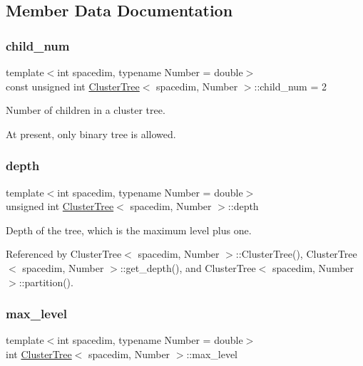 \subsection{Member Data Documentation}
\mbox{\label{classClusterTree_aa9705d3fecd5b405b804331ea031570c}} 
\subsubsection{\texorpdfstring{child\+\_\+num}{child\_num}}
{\footnotesize\ttfamily template$<$int spacedim, typename Number = double$>$ \\
const unsigned int \hyperlink{classClusterTree}{Cluster\+Tree}$<$ spacedim, Number $>$\+::child\+\_\+num = 2\hspace{0.3cm}{\ttfamily [static]}}

Number of children in a cluster tree.

At present, only binary tree is allowed. \mbox{\label{classClusterTree_a051df20340ed3f0e4bc0ee1fb1119f9f}} 
\subsubsection{\texorpdfstring{depth}{depth}}
{\footnotesize\ttfamily template$<$int spacedim, typename Number = double$>$ \\
unsigned int \hyperlink{classClusterTree}{Cluster\+Tree}$<$ spacedim, Number $>$\+::depth\hspace{0.3cm}{\ttfamily [private]}}

Depth of the tree, which is the maximum level plus one. 

Referenced by Cluster\+Tree$<$ spacedim, Number $>$\+::\+Cluster\+Tree(), Cluster\+Tree$<$ spacedim, Number $>$\+::get\+\_\+depth(), and Cluster\+Tree$<$ spacedim, Number $>$\+::partition().

\mbox{\label{classClusterTree_a77800bb9f86c689821ba4d549ce97a58}} 
\subsubsection{\texorpdfstring{max\+\_\+level}{max\_level}}
{\footnotesize\ttfamily template$<$int spacedim, typename Number = double$>$ \\
int \hyperlink{classClusterTree}{Cluster\+Tree}$<$ spacedim, Number $>$\+::max\+\_\+level\hspace{0.3cm}{\ttfamily [private]}}


